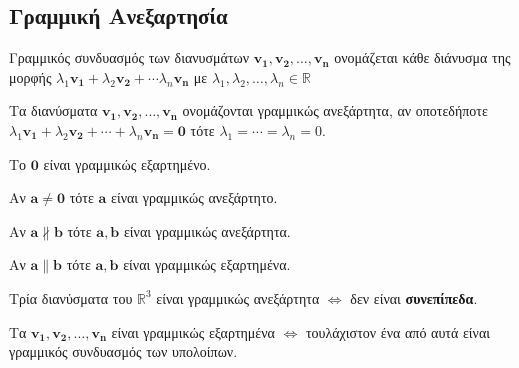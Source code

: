 {  \subsection*{Γραμμική Ανεξαρτησία}
  \begin{myitemize}[leftmargin=*]
    \item \textcolor{Col1}{Γραμμικός συνδυασμός} των διανυσμάτων $ \mathbf{v_{1}},
      \mathbf{v_{2}}, \ldots, \mathbf{v_{n}} $ 
      ονομάζεται κάθε διάνυσμα της μορφής 
      $\lambda_{1} \mathbf{v_{1}}+ \lambda_{2} \mathbf{v_{2}} + \cdots
      \lambda _{n}\mathbf{v_{n}} $ με 
      $ \lambda_{1}, \lambda_{2}, \ldots, \lambda_{n} \in \mathbb{R} $ 
    \item Τα διανύσματα $ \mathbf{v_{1}}, \mathbf{v_{2}}, \ldots, \mathbf{v_{n}} $ 
      ονομάζονται \textcolor{Col1}{γραμμικώς ανεξάρτητα}, αν 
      οποτεδήποτε $\lambda_{1} \mathbf{v_{1}} + \lambda_{2}
      \mathbf{v_{2}} + \cdots + \lambda_{n} \mathbf{v_{n}} \! = \mathbf{0} $ τότε
      $ \lambda_{1} = \cdots = \lambda_{n} \! = 0$. 
    \item Το $ \mathbf{0} $ είναι γραμμικώς εξαρτημένο.
    \item Αν $ \mathbf{a} \neq \mathbf{0} $ τότε $ \mathbf{a}$ 
      είναι γραμμικώς ανεξάρτητο.
    \item Αν $ \mathbf{a} \nparallel \mathbf{b} $ τότε $\mathbf{a}, \mathbf{b} $ 
      είναι γραμμικώς ανεξάρτητα.
    \item Αν $ \mathbf{a} \parallel \mathbf{b} $ τότε $\mathbf{a}, \mathbf{b} $ 
      είναι γραμμικώς εξαρτημένα.
    \item Τρία διανύσματα του $ \mathbb{R}^{3} $ είναι γραμμικώς ανεξάρτητα $
      \Leftrightarrow $ δεν είναι \textbf{συνεπίπεδα}.
    \item Τα $ \mathbf{v_{1}}, \mathbf{v_{2}}, \ldots, \mathbf{v_{n}} $ είναι
      γραμμικώς εξαρτημένα $ \Leftrightarrow $ τουλάχιστον ένα από αυτά είναι γραμμικός 
      συνδυασμός των υπολοίπων.
  \end{myitemize}
}

